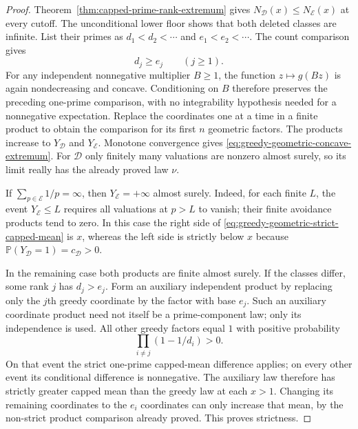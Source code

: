 \documentclass[11pt]{article}
\theoremstyle{definition}
\begin{document}
\begin{proof}
Theorem~\ref{thm:capped-prime-rank-extremum} gives
$N_{\mathcal D}(x)\le N_{\mathcal E}(x)$ at every cutoff.
The unconditional lower floor shows that both deleted classes are
infinite. List their primes as $d_1<d_2<\cdots$ and
$e_1<e_2<\cdots$. The count comparison gives
\[
                                 d_j\ge e_j\qquad(j\ge1).
\]
For any independent nonnegative multiplier $B\ge1$,
the function $z\mapsto g(Bz)$ is again nondecreasing and concave.
Conditioning on $B$ therefore preserves the preceding one-prime
comparison, with no integrability hypothesis needed for a
nonnegative expectation.
Replace the coordinates one at a time in a finite product to obtain
the comparison for its first $n$ geometric factors.
The products increase to $Y_{\mathcal D}$ and $Y_{\mathcal E}$.
Monotone convergence gives \eqref{eq:greedy-geometric-concave-extremum}.
For $\mathcal D$ only finitely many valuations are nonzero almost
surely, so its limit really has the already proved law $\nu$.

If $\sum_{p\in\mathcal E}1/p=\infty$, then $Y_{\mathcal E}=+\infty$
almost surely. Indeed, for each finite $L$, the event
$Y_{\mathcal E}\le L$ requires all valuations at $p>L$ to vanish;
their finite avoidance products tend to zero.
In this case the right side of
\eqref{eq:greedy-geometric-strict-capped-mean} is $x$, whereas the
left side is strictly below $x$ because
$\mathbb P(Y_{\mathcal D}=1)=c_{\mathcal D}>0$.

In the remaining case both products are finite almost surely.
If the classes differ, some rank $j$ has $d_j>e_j$.
Form an auxiliary independent product by replacing only the
$j$th greedy coordinate by the factor with base $e_j$.
Such an auxiliary coordinate product need not itself be a
prime-component law; only its independence is used.
All other greedy factors equal $1$ with positive probability
\[
                    \prod_{i\ne j}(1-1/d_i)>0.
\]
On that event the strict one-prime capped-mean difference applies;
on every other event its conditional difference is nonnegative.
The auxiliary law therefore has strictly greater capped mean than
the greedy law at each $x>1$.
Changing its remaining coordinates to the $e_i$ coordinates can
only increase that mean, by the non-strict product comparison
already proved. This proves strictness.
\end{proof}
\end{document}
